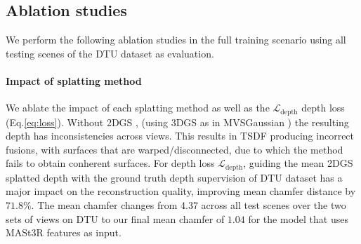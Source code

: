 \subsection{Ablation studies}
\label{sec:abl}
\vspace{-5pt}
We perform the following ablation studies in the full training scenario using all testing scenes of the DTU dataset as evaluation. 


\vspace{-15pt}
\paragraph{\textbf{Impact of splatting method}} We ablate the impact of each splatting method as well as the $\mathcal{L}_{\text{depth}}$ depth loss (Eq.\ref{eq:loss}). Without 2DGS \cite{huang20242d}, (\ie using 3DGS as in MVSGaussian \cite{liu2024fast}) the resulting depth has inconsistencies across views. This results in TSDF producing incorrect fusions, with surfaces that are warped/disconnected, due to which the method fails to obtain conherent surfaces. For depth loss $\mathcal{L}_{\text{depth}}$, guiding the mean 2DGS splatted depth with the ground truth depth supervision of DTU dataset \cite{aanaes2016large} has a major impact on the reconstruction quality, improving mean chamfer distance by $71.8\%$. The mean chamfer changes from $4.37$ across all test scenes over the two sets of views on DTU to our final mean chamfer of $1.04$ for the model that uses MASt3R features as input. 

\vspace{-15pt}
